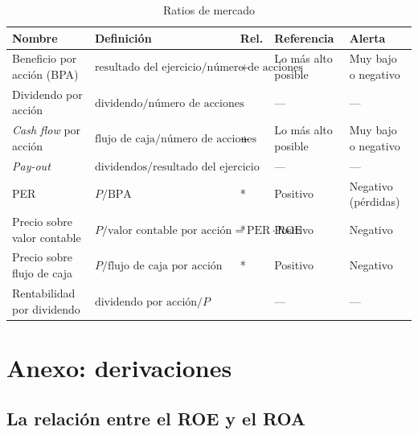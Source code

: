 \documentclass[11pt]{article}
\begin{document}
\begin{table}[H]
\centering
\caption{Ratios de mercado}\label{tab:ratios-mercado}
\footnotesize
\renewcommand{\arraystretch}{1.3}
\begin{tabular}{>{\raggedright\arraybackslash}m{3.1cm}>{\centering\arraybackslash}m{5.4cm}>{\centering\arraybackslash}m{0.9cm}>{\centering\arraybackslash}m{2.1cm}>{\centering\arraybackslash}m{2.4cm}}
\toprule
\rowcolor{tceeazulpalido}\textbf{Nombre} & \textbf{Definición} & \textbf{Rel.} & \textbf{Referencia} & \textbf{Alerta} \\
\midrule
Beneficio por acción (BPA) & $\text{resultado del ejercicio}/\allowbreak \text{número de acciones}$ & + & Lo más alto posible & Muy bajo o negativo \\
Dividendo por acción & $\text{dividendo}/\allowbreak \text{número de acciones}$ & & --- & --- \\
\emph{Cash flow} por acción & $\text{flujo de caja}/\allowbreak \text{número de acciones}$ & + & Lo más alto posible & Muy bajo o negativo \\
\emph{Pay-out} & $\text{dividendos}/\allowbreak \text{resultado del ejercicio}$ & & --- & --- \\
PER & $P/\mathrm{BPA}$ & * & Positivo & Negativo (pérdidas) \\
Precio sobre valor contable & $P/\allowbreak \text{valor contable por acción}=\mathrm{PER}\cdot\mathrm{ROE}$ & * & Positivo & Negativo \\
Precio sobre flujo de caja & $P/\allowbreak \text{flujo de caja por acción}$ & * & Positivo & Negativo \\
Rentabilidad por dividendo & $\text{dividendo por acción}/\allowbreak P$ & & --- & --- \\
\bottomrule
\end{tabular}
\end{table}

\section{Anexo: derivaciones}\label{anexo:derivaciones}

\subsection{La relación entre el ROE y el ROA}\label{anexo:roe-roa}
\end{document}
